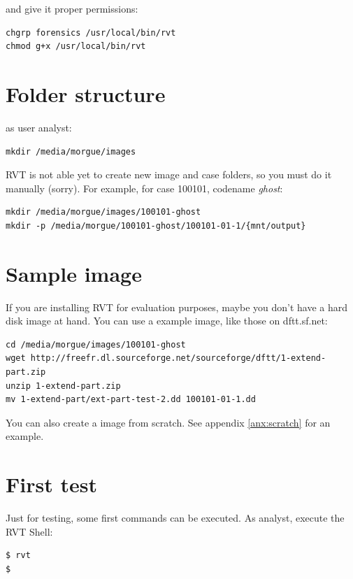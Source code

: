 \documentclass[a4paper,11pt,oneside]{report}
\begin{document}
and give it proper permissions:

\begin{verbatim}
chgrp forensics /usr/local/bin/rvt
chmod g+x /usr/local/bin/rvt
\end{verbatim}


\section{Folder structure}

as user analyst:

\begin{verbatim}
mkdir /media/morgue/images
\end{verbatim}

RVT is not able yet to create new image and case folders, so you must do it manually (sorry). For example, for case 100101, codename \emph{ghost}:

\begin{verbatim}
mkdir /media/morgue/images/100101-ghost
mkdir -p /media/morgue/100101-ghost/100101-01-1/{mnt/output}
\end{verbatim}


\section{Sample image}

If you are installing RVT for evaluation purposes, maybe you don't have a hard disk image at hand. You can use a example image, like those on dftt.sf.net:

\begin{verbatim}
cd /media/morgue/images/100101-ghost
wget http://freefr.dl.sourceforge.net/sourceforge/dftt/1-extend-part.zip
unzip 1-extend-part.zip
mv 1-extend-part/ext-part-test-2.dd 100101-01-1.dd
\end{verbatim}

You can also create a image from scratch. See appendix \ref{anx:scratch} for an example.



\section{First test}

Just for testing, some first commands can be executed. As analyst, execute the RVT Shell:

\begin{verbatim}
$ rvt
$
\end{verbatim}
\end{document}
